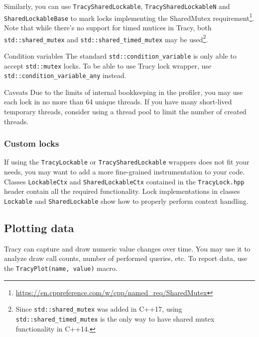 \documentclass[hidelinks,titlepage,a4paper]{article}
\begin{document}
Similarly, you can use \texttt{TracySharedLockable}, \texttt{TracySharedLockableN} and \texttt{SharedLockableBase} to mark locks implementing the SharedMutex requirement\footnote{\url{https://en.cppreference.com/w/cpp/named_req/SharedMutex}}. Note that while there's no support for timed mutices in Tracy, both \texttt{std::shared\_mutex} and \texttt{std::shared\_timed\_mutex} may be used\footnote{Since \texttt{std::shared\_mutex} was added in C++17, using \texttt{std::shared\_timed\_mutex} is the only way to have shared mutex functionality in C++14.}.

\begin{bclogo}[
noborder=true,
couleur=black!5,
logo=\bclampe
]{Condition variables}
The standard \texttt{std::condition\_variable} is only able to accept \texttt{std::mutex} locks. To be able to use Tracy lock wrapper, use \texttt{std::condition\_variable\_any} instead.
\end{bclogo}

\begin{bclogo}[
noborder=true,
couleur=black!5,
logo=\bcattention
]{Caveats}
Due to the limits of internal bookkeeping in the profiler, you may use each lock in no more than 64 unique threads. If you have many short-lived temporary threads, consider using a thread pool to limit the number of created threads.
\end{bclogo}

\subsubsection{Custom locks}

If using the \texttt{TracyLockable} or \texttt{TracySharedLockable} wrappers does not fit your needs, you may want to add a more fine-grained instrumentation to your code. Classes \texttt{LockableCtx} and \texttt{SharedLockableCtx} contained in the \texttt{TracyLock.hpp} header contain all the required functionality. Lock implementations in classes \texttt{Lockable} and \texttt{SharedLockable} show how to properly perform context handling.

\subsection{Plotting data}
\label{plottingdata}

Tracy can capture and draw numeric value changes over time. You may use it to analyze draw call counts, number of performed queries, etc. To report data, use the \texttt{TracyPlot(name, value)} macro.
\end{document}
